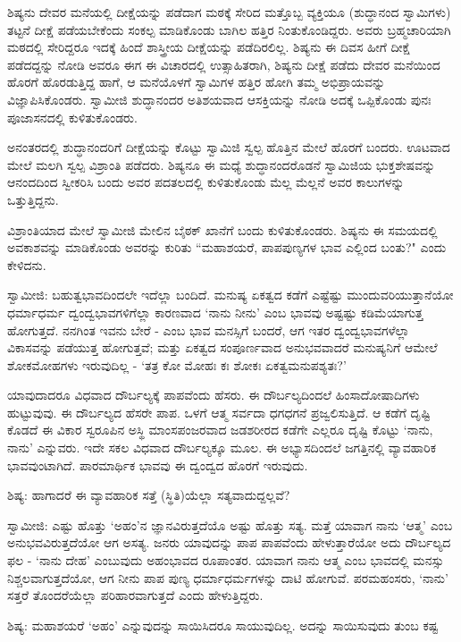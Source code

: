 ಶಿಷ್ಯನು ದೇವರ ಮನೆಯಲ್ಲಿ ದೀಕ್ಷೆಯನ್ನು ಪಡೆದಾಗ ಮಠಕ್ಕೆ ಸೇರಿದ ಮತ್ತೊಬ್ಬ ವ್ಯಕ್ತಿಯೂ (ಶುದ್ಧಾನಂದ ಸ್ವಾಮಿಗಳು) ತಟ್ಟನೆ ದೀಕ್ಷೆ ಪಡೆಯಬೇಕೆಂದು ಸಂಕಲ್ಪ ಮಾಡಿಕೊಂಡು ಬಾಗಿಲ ಹತ್ತಿರ ನಿಂತುಕೊಂಡಿದ್ದರು. ಅವರು ಬ್ರಹ್ಮಚಾರಿಯಾಗಿ ಮಠದಲ್ಲಿ ಸೇರಿದ್ದರೂ ಇದಕ್ಕೆ ಹಿಂದೆ ಶಾಸ್ತ್ರೀಯ ದೀಕ್ಷೆಯನ್ನು ಪಡೆದಿರಲಿಲ್ಲ. ಶಿಷ್ಯನು ಈ ದಿವಸ ಹೀಗೆ ದೀಕ್ಷೆ ಪಡೆದದ್ದನ್ನು ನೋಡಿ ಅವರೂ ಈಗ ಈ ವಿಚಾರದಲ್ಲಿ ಉತ್ಸಾಹಿತರಾಗಿ, ಶಿಷ್ಯನು ದೀಕ್ಷೆ ಪಡೆದು ದೇವರ ಮನೆಯಿಂದ ಹೊರಗೆ ಹೊರಡುತ್ತಿದ್ದ ಹಾಗೆ, ಆ ಮನೆಯೊಳಗೆ ಸ್ವಾಮಿಗಳ ಹತ್ತಿರ ಹೋಗಿ ತಮ್ಮ ಅಭಿಪ್ರಾಯವನ್ನು ವಿಜ್ಞಾಪಿಸಿಕೊಂಡರು. ಸ್ವಾಮೀಜಿ ಶುದ್ಧಾನಂದರ ಅತಿಶಯವಾದ ಆಸಕ್ತಿಯನ್ನು ನೋಡಿ ಅದಕ್ಕೆ ಒಪ್ಪಿಕೊಂಡು ಪುನಃ ಪೂಜಾಸನದಲ್ಲಿ ಕುಳಿತುಕೊಂಡರು.

ಅನಂತರದಲ್ಲಿ ಶುದ್ಧಾನಂದರಿಗೆ ದೀಕ್ಷೆಯನ್ನು ಕೊಟ್ಟು ಸ್ವಾಮಿಜಿ ಸ್ವಲ್ಪ ಹೊತ್ತಿನ ಮೇಲೆ ಹೊರಗೆ ಬಂದರು. ಊಟವಾದ ಮೇಲೆ ಮಲಗಿ ಸ್ವಲ್ಪ ವಿಶ್ರಾಂತಿ ಪಡೆದರು. ಶಿಷ್ಯನೂ ಈ ಮಧ್ಯೆ ಶುದ್ಧಾನಂದರೊಡನೆ ಸ್ವಾಮಿಜಿಯ ಭುಕ್ತಶೇಷವನ್ನು ಆನಂದದಿಂದ ಸ್ವೀಕರಿಸಿ ಬಂದು ಅವರ ಪದತಲದಲ್ಲಿ ಕುಳಿತುಕೊಂಡು ಮೆಲ್ಲ ಮೆಲ್ಲನೆ ಅವರ ಕಾಲುಗಳನ್ನು ಒತ್ತುತ್ತಿದ್ದನು.

ವಿಶ್ರಾಂತಿಯಾದ ಮೇಲೆ ಸ್ವಾಮೀಜಿ ಮೇಲಿನ ಬೈಠಕ್ ಖಾನೆಗೆ ಬಂದು ಕುಳಿತುಕೊಂಡರು. ಶಿಷ್ಯನು ಈ ಸಮಯದಲ್ಲಿ ಅವಕಾಶವನ್ನು ಮಾಡಿಕೊಂಡು ಅವರನ್ನು ಕುರಿತು “ಮಹಾಶಯರೆ, ಪಾಪಪುಣ್ಯಗಳ ಭಾವ ಎಲ್ಲಿಂದ ಬಂತು?" ಎಂದು ಕೇಳಿದನು.

ಸ್ವಾಮೀಜಿ: ಬಹುತ್ವಭಾವದಿಂದಲೇ ಇದೆಲ್ಲಾ ಬಂದಿದೆ. ಮನುಷ್ಯ ಏಕತ್ವದ ಕಡೆಗೆ ಎಷ್ಟೆಷ್ಟು ಮುಂದುವರಿಯುತ್ತಾನೆಯೋ ಧರ್ಮಾಧರ್ಮ ದ್ವಂದ್ವಭಾವಗಳಿಗೆಲ್ಲಾ ಕಾರಣವಾದ ‘ನಾನು ನೀನು’ ಎಂಬ ಭಾವವು ಅಷ್ಟಷ್ಟು ಕಡಿಮೆಯಾಗುತ್ತ ಹೋಗುತ್ತದೆ. ನನಗಿಂತ ಇವನು ಬೇರೆ - ಎಂಬ ಭಾವ ಮನಸ್ಸಿಗೆ ಬಂದರೆ, ಆಗ ಇತರ ದ್ವಂದ್ವಭಾವಗಳೆಲ್ಲಾ ವಿಕಾಸವನ್ನು ಪಡೆಯುತ್ತ ಹೋಗುತ್ತವೆ; ಮತ್ತು ಏಕತ್ವದ ಸಂಪೂರ್ಣವಾದ ಅನುಭವವಾದರೆ ಮನುಷ್ಯನಿಗೆ ಆಮೇಲೆ ಶೋಕಮೋಹಗಳು ಇರುವುದಿಲ್ಲ - ‘ತತ್ರ ಕೋ ಮೋಹಃ ಕಃ ಶೋಕಃ ಏಕತ್ವಮನುಪಶ್ಯತಃ?’

ಯಾವುದಾದರೂ ವಿಧವಾದ ದೌರ್ಬಲ್ಯಕ್ಕೆ ಪಾಪವೆಂದು ಹೆಸರು. ಈ ದೌರ್ಬಲ್ಯದಿಂದಲೆ ಹಿಂಸಾದೋಷಾದಿಗಳು ಹುಟ್ಟುವುವು. ಈ ದೌರ್ಬಲ್ಯದ ಹೆಸರೇ ಪಾಪ. ಒಳಗೆ ಆತ್ಮ ಸರ್ವದಾ ಧಗಧಗನೆ ಪ್ರಜ್ವಲಿಸುತ್ತಿದೆ. ಆ ಕಡೆಗೆ ದೃಷ್ಟಿ ಕೊಡದೆ ಈ ವಿಕಾರ ಸ್ವರೂಪಿನ ಅಸ್ಥಿ ಮಾಂಸಪಂಜರವಾದ ಜಡಶರೀರದ ಕಡೆಗೇ ಎಲ್ಲರೂ ದೃಷ್ಟಿ ಕೊಟ್ಟು ‘ನಾನು, ನಾನು’ ಎನ್ನುವರು. ಇದೇ ಸಕಲ ವಿಧವಾದ ದೌರ್ಬಲ್ಯಕ್ಕೂ ಮೂಲ. ಈ ಅಭ್ಯಾಸದಿಂದಲೆ ಜಗತ್ತಿನಲ್ಲಿ ವ್ಯಾವಹಾರಿಕ ಭಾವವುಂಟಾಗಿದೆ. ಪಾರಮಾರ್ಥಿಕ ಭಾವವು ಈ ದ್ವಂದ್ವದ ಹೊರಗೆ ಇರುವುದು.

ಶಿಷ್ಯ: ಹಾಗಾದರೆ ಈ ವ್ಯಾವಹಾರಿಕ ಸತ್ತೆ (ಸ್ಥಿತಿ)ಯೆಲ್ಲಾ ಸತ್ಯವಾದುದ್ದಲ್ಲವೆ?

ಸ್ವಾಮೀಜಿ: ಎಷ್ಟು ಹೊತ್ತು ‘ಅಹಂ’ನ ಜ್ಞಾನವಿರುತ್ತದೆಯೊ ಅಷ್ಟು ಹೊತ್ತು ಸತ್ಯ. ಮತ್ತೆ ಯಾವಾಗ ನಾನು ‘ಆತ್ಮ’ ಎಂಬ ಅನುಭವವಿರುತ್ತದೆಯೋ ಆಗ ಅಸತ್ಯ. ಜನರು ಯಾವುದನ್ನು ಪಾಪ ಪಾಪವೆಂದು ಹೇಳುತ್ತಾರೆಯೋ ಅದು ದೌರ್ಬಲ್ಯದ ಫಲ - ‘ನಾನು ದೇಹ’ ಎಂಬುವುದು ಅಹಂಭಾವದ ರೂಪಾಂತರ. ಯಾವಾಗ ನಾನು ಆತ್ಮ ಎಂಬ ಭಾವದಲ್ಲಿ ಮನಸ್ಸು ನಿಶ್ಚಲವಾಗುತ್ತದೆಯೋ, ಆಗ ನೀನು ಪಾಪ ಪುಣ್ಯ ಧರ್ಮಾಧರ್ಮಗಳನ್ನು ದಾಟಿ ಹೋಗುವೆ. ಪರಮಹಂಸರು, ‘ನಾನು’ ಸತ್ತರೆ ತೊಂದರೆಯೆಲ್ಲಾ ಪರಿಹಾರವಾಗುತ್ತದೆ ಎಂದು ಹೇಳುತ್ತಿದ್ದರು.

ಶಿಷ್ಯ: ಮಹಾಶಯರೆ ‘ಅಹಂ’ ಎನ್ನುವುದನ್ನು ಸಾಯಿಸಿದರೂ ಸಾಯುವುದಿಲ್ಲ. ಅದನ್ನು ಸಾಯಿಸುವುದು ತುಂಬ ಕಷ್ಟ

